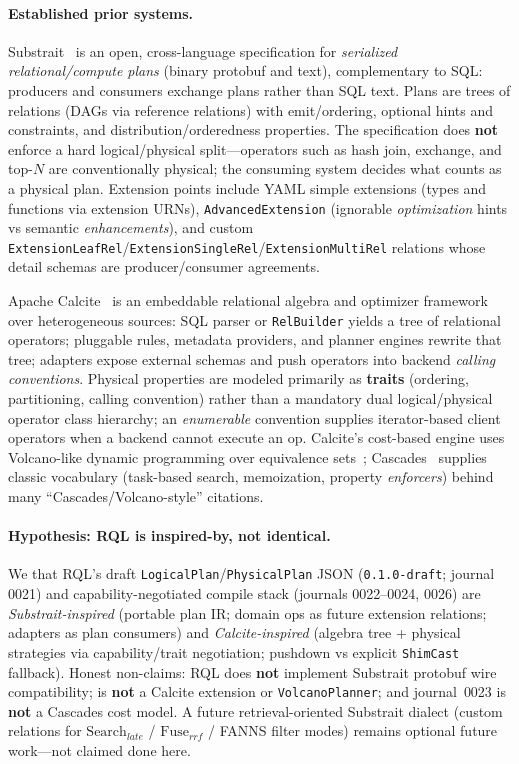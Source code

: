 \paragraph{Established prior systems.}
Substrait~\citep{substrait} is an open, cross-language specification for \emph{serialized relational/compute plans} (binary protobuf and text), complementary to SQL: producers and consumers exchange plans rather than SQL text.
Plans are trees of relations (DAGs via reference relations) with emit/ordering, optional hints and constraints, and distribution/orderedness properties.
The specification does \textbf{not} enforce a hard logical/physical split---operators such as hash join, exchange, and top-$N$ are conventionally physical; the consuming system decides what counts as a physical plan.
Extension points include YAML simple extensions (types and functions via extension URNs), \texttt{AdvancedExtension} (ignorable \emph{optimization} hints vs semantic \emph{enhancements}), and custom \texttt{ExtensionLeafRel}/\texttt{ExtensionSingleRel}/\texttt{ExtensionMultiRel} relations whose detail schemas are producer/consumer agreements.

Apache Calcite~\citep{begoli2018calcite} is an embeddable relational algebra and optimizer framework over heterogeneous sources: SQL parser or \texttt{RelBuilder} yields a tree of relational operators; pluggable rules, metadata providers, and planner engines rewrite that tree; adapters expose external schemas and push operators into backend \emph{calling conventions}.
Physical properties are modeled primarily as \textbf{traits} (ordering, partitioning, calling convention) rather than a mandatory dual logical/physical operator class hierarchy; an \emph{enumerable} convention supplies iterator-based client operators when a backend cannot execute an op.
Calcite's cost-based engine uses Volcano-like dynamic programming over equivalence sets~\citep{begoli2018calcite}; Cascades~\citep{graefe1995cascades} supplies classic vocabulary (task-based search, memoization, property \emph{enforcers}) behind many ``Cascades/Volcano-style'' citations.

\paragraph{Hypothesis: RQL is inspired-by, not identical.}
We \hypothesis{} that RQL's draft \texttt{LogicalPlan}/\texttt{PhysicalPlan} JSON (\texttt{0.1.0-draft}; journal 0021) and capability-negotiated compile stack (journals 0022--0024, 0026) are \emph{Substrait-inspired} (portable plan IR; domain ops as future extension relations; adapters as plan consumers) and \emph{Calcite-inspired} (algebra tree + physical strategies via capability/trait negotiation; pushdown vs explicit \texttt{ShimCast} fallback).
Honest non-claims: RQL does \textbf{not} implement Substrait protobuf wire compatibility; is \textbf{not} a Calcite extension or \texttt{VolcanoPlanner}; and journal~0023 is \textbf{not} a Cascades cost model.
A future retrieval-oriented Substrait dialect (custom relations for $\mathrm{Search}_{late}$ / $\mathrm{Fuse}_{rrf}$ / FANNS filter modes) remains optional future work---not claimed done here.
